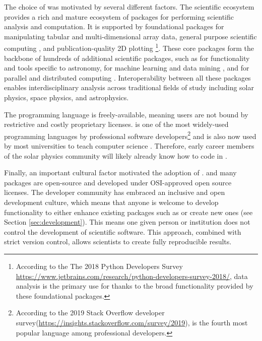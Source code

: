 The choice of \python was motivated by several different factors.
The scientific \python ecosystem provides a rich and mature ecosystem of packages for performing scientific analysis and computation.
It is supported by foundational packages for manipulating tabular \citep[\pandaspkg,][]{pandas} and multi-dimensional array \citep[\numpypkg,][]{numpy} data, general purpose scientific computing \citep[\scipypkg,][]{scipy}, and publication-quality 2D plotting \citep[\matplotlibpkg,][]{matplotlib}\footnote{According to the The 2018 Python Developers Survey \url{https://www.jetbrains.com/research/python-developers-survey-2018/}, data analysis is the primary use for \python thanks to the broad functionality provided by these foundational packages.}.
These core packages form the backbone of hundreds of additional scientific \python packages, such as \astropypkg for functionality and tools specific to astronomy,  for machine learning and data mining \citep{pedregosa11}, and  for parallel and distributed computing \citep{rocklin15}.
Interoperability between all these packages enables interdisciplinary analysis across traditional fields of study including solar physics, space physics, and astrophysics.

The \python programming language is freely-available, meaning users are not bound by restrictive and costly proprietary licenses.
\python is one of the most widely-used programming languages by professional software developers\footnote{According to the 2019 Stack Overflow developer survey(\url{https://insights.stackoverflow.com/survey/2019}), \python is the fourth most popular language among professional developers.} and is also now used by most universities to teach computer science \citep{guo2014}.
Therefore, early career members of the solar physics community will likely already know how to code in \python.

Finally, an important cultural factor motivated the adoption of \python.
\python and many \python packages are open-source and developed under OSI-approved open source licenses.
The \python developer community has embraced an inclusive and open development culture, which means that anyone is welcome to develop functionality to either enhance existing packages such as \sunpypkg or create new ones (see Section \ref{sec:development}).
This means one given person or institution does not control the development of scientific \python software.
This approach, combined with strict version control, allows scientists to create fully reproducible results.

